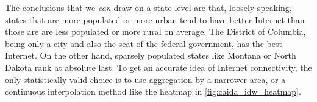 The conclusions that we \textit{can} draw on a state level are that, loosely speaking, states that are more populated or more urban tend to have better Internet than those are are less populated or more rural on average. The District of Columbia, being only a city and also the seat of the \us federal government, has the best Internet. On the other hand, sparsely populated states like Montana or North Dakota rank at absolute last. To get an accurate idea of Internet connectivity, the only statistically-valid choice is to use aggregation by a narrower area, or a continuous interpolation method like the \idw heatmap in \cref{fig:caida_idw_heatmap}.
